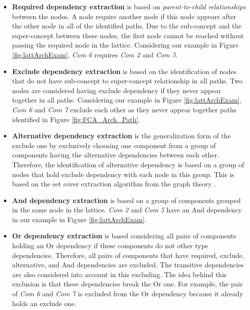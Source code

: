 \documentclass[graybox]{svmult}
\begin{document}
\begin{itemize}

\item \textbf{Required dependency extraction} is based on \textit{parent-to-child relationships} between the nodes. A node require another node if this node appears after the other node in all of the identified paths. Due to the sub-concept and the super-concept between these nodes, the first node cannot be reached without passing the required node in the lattice. Considering our example in Figure \ref{fig:lattArchExam}, \textit{Com 6} requires \textit{Com 2} and \textit{Com 5}. 


\item \textbf{Exclude dependency extraction} is based on the identification of nodes that do not have sub-concept to super-concept relationship in all paths.  Two nodes are considered having exclude dependency if they never appear together in all paths. Considering our example in Figure \ref{fig:lattArchExam}, \textit{Com 6} and \textit{Com 7} exclude each other as they never appear together paths identified in Figure \ref{fig:FCA_Arch_Path}. 

\item \textbf{Alternative dependency extraction} is the generalization form of the exclude one by exclusively choosing one component from a group of components having the alternative dependencies between each other. Therefore, the identification of alternative dependency is based on a group of nodes that hold exclude dependency with each node in this group. This is based on the set cover extraction algorithm from the graph theory \cite{cormen2009introduction}. 

\item \textbf{And dependency extraction} is based on a group of components grouped in the same node in the lattice. \textit{Com 2} and \textit{Com 5} have an And dependency in our example in Figure \ref{fig:lattArchExam}. 

\item \textbf{Or dependency extraction} is based considering all pairs of components holding an Or dependency if these components do not other type dependencies. Therefore, all pairs of components that have required, exclude, alternative, and And dependencies are excluded. The transitive dependencies are also considered into account in this excluding. The idea behind  this exclusion is that these dependencies break the Or one. For example,  the pair of \textit{Com 6} and \textit{Com 7} is excluded from the Or dependency because it already holds an exclude one.  


\end{itemize}
\end{document}
